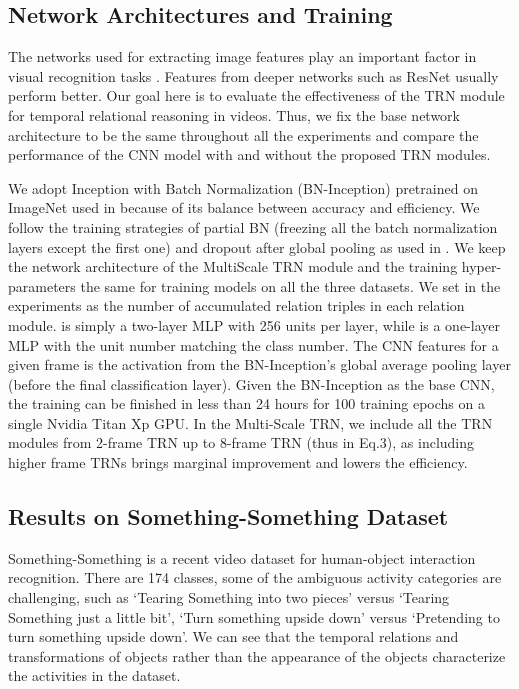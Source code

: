 \documentclass[runningheads]{llncs}
\begin{document}
\subsection{Network Architectures and Training}

The networks used for extracting image features play an important factor in visual recognition tasks \cite{sharif2014cnn}. Features from deeper networks such as ResNet \cite{he2016deep} usually perform better. Our goal here is to evaluate the effectiveness of the TRN module for temporal relational reasoning in videos. Thus, we fix the base network architecture to be the same throughout all the experiments and compare the performance of the CNN model with and without the proposed TRN modules. 

We adopt Inception with Batch Normalization (BN-Inception) pretrained on ImageNet used in \cite{ioffe2015batch} because of its balance between accuracy and efficiency. We follow the training strategies of partial BN (freezing all the batch normalization layers except the first one) and dropout after global pooling as used in \cite{wang2016temporal}. We keep the network architecture of the MultiScale TRN module and the training hyper-parameters the same for training models on all the three datasets. We set  in the experiments as the number of accumulated relation triples in each relation module.  is simply a two-layer MLP with 256 units per layer, while  is a one-layer MLP with the unit number matching the class number. The CNN features for a given frame is the activation from the BN-Inception's global average pooling layer (before the final classification layer). Given the BN-Inception as the base CNN, the training can be finished in less than 24 hours for 100 training epochs on a single Nvidia Titan Xp GPU. In the Multi-Scale TRN, we include all the TRN modules from 2-frame TRN up to 8-frame TRN (thus  in Eq.3), as including higher frame TRNs brings marginal improvement and lowers the efficiency.

\subsection{Results on Something-Something Dataset}

Something-Something is a recent video dataset for human-object interaction recognition. There are 174 classes, some of the ambiguous activity categories are challenging, such as `Tearing Something into two pieces' versus `Tearing Something just a little bit', `Turn something upside down' versus `Pretending to turn something upside down'. We can see that the temporal relations and transformations of objects rather than the appearance of the objects characterize the activities in the dataset.
\end{document}
